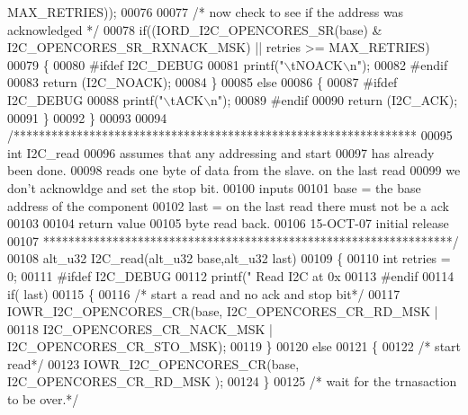 \begin{DoxyCode}
{{      MAX_RETRIES));
00076 
00077          \textcolor{comment}{/* now check to see if the address was acknowledged */}
00078    \textcolor{keywordflow}{if}((IORD_I2C_OPENCORES_SR(base) & I2C_OPENCORES_SR_RXNACK_MSK) || retries >= 
      MAX_RETRIES)
00079    \{
00080 \textcolor{preprocessor}{#ifdef  I2C\_DEBUG}
00081         printf(\textcolor{stringliteral}{"\(\backslash\)tNOACK\(\backslash\)n"});
00082 \textcolor{preprocessor}{#endif}
00083         \textcolor{keywordflow}{return} (I2C_NOACK);
00084    \}
00085    \textcolor{keywordflow}{else}
00086    \{
00087 \textcolor{preprocessor}{#ifdef  I2C\_DEBUG}
00088         printf(\textcolor{stringliteral}{"\(\backslash\)tACK\(\backslash\)n"});
00089 \textcolor{preprocessor}{#endif}
00090        \textcolor{keywordflow}{return} (I2C_ACK);
00091    \}
00092 \}
00093 
00094 \textcolor{comment}{/****************************************************************}
00095 \textcolor{comment}{int I2C\_read}
00096 \textcolor{comment}{            assumes that any addressing and start}
00097 \textcolor{comment}{            has already been done.}
00098 \textcolor{comment}{            reads one byte of data from the slave.  on the last read}
00099 \textcolor{comment}{            we don't acknowldge and set the stop bit.}
00100 \textcolor{comment}{inputs}
00101 \textcolor{comment}{      base = the base address of the component}
00102 \textcolor{comment}{      last = on the last read there must not be a ack}
00103 \textcolor{comment}{}
00104 \textcolor{comment}{return value}
00105 \textcolor{comment}{       byte read back.}
00106 \textcolor{comment}{15-OCT-07 initial release}
00107 \textcolor{comment}{*****************************************************************/}
00108 alt_u32 I2C_read(alt_u32 base,alt_u32 last)
00109 \{
00110     \textcolor{keywordtype}{int} retries = 0;
00111 \textcolor{preprocessor}{#ifdef  I2C\_DEBUG}
00112         printf(\textcolor{stringliteral}{" Read I2C at 0x%
00113 \textcolor{preprocessor}{#endif}
00114   \textcolor{keywordflow}{if}( last)
00115   \{
00116                \textcolor{comment}{/* start a read and no ack and stop bit*/}
00117            IOWR_I2C_OPENCORES_CR(base, I2C_OPENCORES_CR_RD_MSK |
00118                I2C_OPENCORES_CR_NACK_MSK | I2C_OPENCORES_CR_STO_MSK);
00119   \}
00120   \textcolor{keywordflow}{else}
00121   \{
00122           \textcolor{comment}{/* start read*/}
00123           IOWR_I2C_OPENCORES_CR(base, I2C_OPENCORES_CR_RD_MSK );
00124   \}
00125           \textcolor{comment}{/* wait for the trnasaction to be over.*/}
}}}
\end{DoxyCode}
